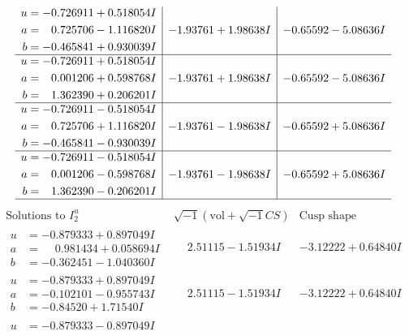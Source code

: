 \documentclass[1p]{elsarticle_modified}
\theoremstyle{definition}
\newcommand{\I}{\sqrt{-1}}
\begin{document}
$$\begin{array}{c|c|c}
\begin{aligned}
u &= -0.726911 + 0.518054 I \\
a &= \phantom{-}0.725706 - 1.116820 I \\
b &= -0.465841 + 0.930039 I\end{aligned}
 & -1.93761 + 1.98638 I & -0.65592 - 5.08636 I \\ \hline\begin{aligned}
u &= -0.726911 + 0.518054 I \\
a &= \phantom{-}0.001206 + 0.598768 I \\
b &= \phantom{-}1.362390 + 0.206201 I\end{aligned}
 & -1.93761 + 1.98638 I & -0.65592 - 5.08636 I \\ \hline\begin{aligned}
u &= -0.726911 - 0.518054 I \\
a &= \phantom{-}0.725706 + 1.116820 I \\
b &= -0.465841 - 0.930039 I\end{aligned}
 & -1.93761 - 1.98638 I & -0.65592 + 5.08636 I \\ \hline\begin{aligned}
u &= -0.726911 - 0.518054 I \\
a &= \phantom{-}0.001206 - 0.598768 I \\
b &= \phantom{-}1.362390 - 0.206201 I\end{aligned}
 & -1.93761 - 1.98638 I & -0.65592 + 5.08636 I\\
 \hline 
 \end{array}$$\newpage$$\begin{array}{c|c|c}  
\text{Solutions to }I^u_{2}& \I (\text{vol} + \sqrt{-1}CS) & \text{Cusp shape}\\
 \hline 
\begin{aligned}
u &= -0.879333 + 0.897049 I \\
a &= \phantom{-}0.981434 + 0.058694 I \\
b &= -0.362451 - 1.040360 I\end{aligned}
 & \phantom{-}2.51115 - 1.51934 I & -3.12222 + 0.64840 I \\ \hline\begin{aligned}
u &= -0.879333 + 0.897049 I \\
a &= -0.102101 - 0.955743 I \\
b &= -0.84520 + 1.71540 I\end{aligned}
 & \phantom{-}2.51115 - 1.51934 I & -3.12222 + 0.64840 I \\ \hline\begin{aligned}
u &= -0.879333 - 0.897049 I \\

\end{aligned}
\end{array}$$
\end{document}
